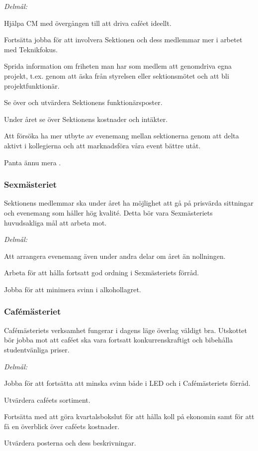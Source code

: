 \documentclass[../_main/handlingar.tex]{subfiles}
\begin{document}
\emph{Delmål:}
\begin{dashlist}
    \item Hjälpa CM med övergången till att driva caféet ideellt.
    \item Fortsätta jobba för att involvera Sektionen och dess medlemmar mer i arbetet med Teknikfokus.
    \item Sprida information om friheten man har som medlem att genomdriva egna projekt, t.ex. genom att äska från styrelsen eller sektionsmötet och att bli projektfunktionär.
    \item Se över och utvärdera Sektionens funktionärsposter.
    \item Under året se över Sektionens kostnader och intäkter.
    \item Att försöka ha mer utbyte av evenemang mellan sektionerna genom att delta aktivt i kollegierna och att marknadsföra våra event bättre utåt.
    \item Panta ännu mera \scalebox{0.4}{\recycle}.
\end{dashlist}

\subsubsection*{Sexmästeriet}
Sektionens medlemmar ska under året ha möjlighet att gå på prisvärda sittningar och evenemang som håller hög kvalité. Detta bör vara Sexmästeriets huvudsakliga mål att arbeta mot.

\emph{Delmål:}
\begin{dashlist}
    \item Att arrangera evenemang även under andra delar om året än nollningen.
    \item Arbeta för att hålla fortsatt god ordning i Sexmästeriets förråd.
    \item Jobba för att minimera svinn i alkohollagret.
\end{dashlist}

\newpage

\subsubsection*{Cafémästeriet}
Cafémästeriets verksamhet fungerar i dagens läge överlag väldigt bra. Utskottet bör jobba mot att caféet ska vara fortsatt konkurrenskraftigt och bibehålla studentvänliga priser.

\emph{Delmål:}
\begin{dashlist}
    \item Jobba för att fortsätta att minska svinn både i LED och i Cafémästeriets förråd.
    \item Utvärdera caféets sortiment.
    \item Fortsätta med att göra kvartalsbokslut för att hålla koll på ekonomin samt för att få en överblick över caféets kostnader.
    \item Utvärdera posterna och dess beskrivningar.
\end{dashlist}
\end{document}
